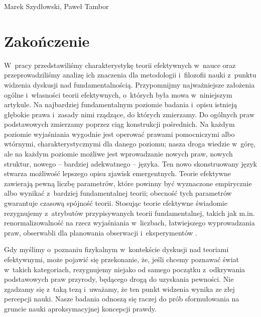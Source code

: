\begin{artplenv2auth}{Marek Szydłowski, Paweł Tambor}
\section{Zakończenie}
W~pracy przedstawiliśmy charakterystykę teorii efektywnych w~nauce oraz przeprowadziliśmy analizę ich znaczenia dla metodologii i~filozofii nauki z~punktu widzenia dyskusji nad fundamentalnością. Przypomnijmy najważniejsze założenia ogólne i~własności teorii efektywnych, o~których była mowa w~niniejszym artykule. Na najbardziej fundamentalnym poziomie badania i~opisu istnieją głębokie prawa i~zasady nimi rządzące, do których zmierzamy. Do ogólnych praw podstawowych zmierzamy poprzez ciąg konstrukcji pośrednich. Na każdym poziomie wyjaśniania wygodnie jest operować prawami pomocniczymi albo wtórnymi, charakterystycznymi dla danego poziomu; nasza droga wiedzie w~górę, ale na każdym poziomie możliwe jest wprowadzanie nowych praw, nowych struktur, nowego -- bardziej adekwatnego -- języka. Ten nowo skonstruowany język stwarza możliwość lepszego opisu zjawisk emergentnych. Teorie efektywne zawierają pewną liczbę parametrów, które powinny być wyznaczone empirycznie albo wynikać z~bardziej fundamentalnej teorii; obecność tych parametrów gwarantuje czasową spójność teorii. Stosując teorie efektywne świadomie rezygnujemy z~atrybutów przypisywanych teorii fundamentalnej, takich jak m.in. renormalizowalność na rzecz wyjaśniania w~liczbach, łatwiejszego wyprowadzania praw, obserwabli dla planowania obserwacji i~eksperymentów
\parencite[][]{butterfield_renormalization_2015}.%


Gdy myślimy o~poznaniu fizykalnym w~kontekście dyskusji nad teoriami efektywnymi, może pojawić się przekonanie, że, jeśli chcemy poznawać świat w~takich kategoriach, rezygnujemy niejako od samego początku z~odkrywania podstawowych praw przyrody, będącego drogą do uzyskania pewności. Nie zgadzamy się z~taką tezą i~uważamy, że ten punkt widzenia wynika ze złej percepcji nauki. Nasze badania odnoszą się raczej do prób sformułowania na gruncie nauki aproksymacyjnej koncepcji prawdy.


\end{artplenv2auth}
